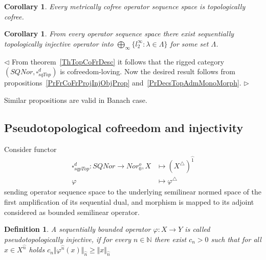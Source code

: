 \documentclass[12pt]{article}
\newtheorem{corollary}[theorem]{Corollary}
\newtheorem{definition}[theorem]{Definition}
\newenvironment{proof}{\par $\triangleleft$}{$\triangleright$}
\begin{document}
\begin{corollary}\label{PrMetrCoFrIsTopFr}
Every metrically cofree operator sequence space is topologically cofree.
\end{corollary}


\begin{corollary}\label{CorSQSpaceIsFromTopAdmMonoMorph}
From every operator sequence space there exist sequentially topologically 
injective operator into $\bigoplus_\infty \{l_2^\infty:\lambda\in\Lambda \}$  
for some set $\Lambda$.
\end{corollary}
\begin{proof} From theorem~\ref{ThTopCoFrDesc} it follows that the rigged 
category $(SQNor,\square_{sqTop}^d)$ is cofreedom-loving. Now the desired 
result follows from propositions~\ref{PrFrCoFrProjInjObjProp} 
and~\ref{PrDecsTopAdmMonoMorph}.
\end{proof} 

Similar propositions are valid in Banach case.





























\subsection{Pseudotopological cofreedom and injectivity}

Consider functor
$$
\begin{aligned}
\square_{sqpTop}^d : SQNor \rightarrow Nor_0^o, X &\mapsto
{(X^\triangle)}^{\wideparen{1}}\\
\varphi&\mapsto\varphi^\triangle
\end{aligned}
$$
sending operator sequence space to the underlying semilinear normed space of 
the first amplification of its sequential dual, and morphism is mapped to its 
adjoint  considered as bounded semilinear operator.

\begin{definition}\label{DefPsSQTopInjOp} A sequentially bounded 
operator $\varphi:X\to Y$ is called pseudotopologically injective, 
if for every $n\in\mathbb{N}$ 
there exist $c_n>0$ such that for all $x\in X^{\wideparen{n}}$ 
holds $c_n\Vert\varphi^{\wideparen{n}}(x)\Vert_{\wideparen{n}}
\geq \Vert x\Vert_{\wideparen{n}}$
\end{definition}
\end{document}
